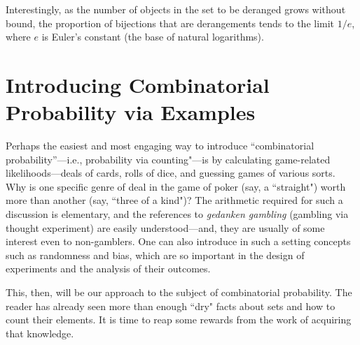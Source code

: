 \medskip

Interestingly, as the number of objects in the set to be deranged grows without bound, the
proportion of bijections that are derangements tends to the limit $1/e$, where $e$ is Euler's
constant (the base of natural logarithms).



\section{Introducing Combinatorial Probability via Examples}
\label{sec:combinatorial-prob}

 

Perhaps the easiest and most engaging way to introduce ``combinatorial probability''---i.e., probability via counting"---is by calculating game-related likelihoods---deals of cards, rolls of dice, and guessing games of various sorts.  Why is one specific genre of deal in the game of poker (say, a ``straight") worth more than another (say, ``three of a kind")?  The arithmetic required for such a discussion is elementary, and the references to {\it gedanken gambling} (gambling via thought experiment) are easily understood---and, they are usually of some interest even to non-gamblers.  One can also introduce in such a setting concepts such as randomness and bias, which are so important in the design of experiments and the analysis of their outcomes.

\smallskip

This, then, will be our approach to the subject of combinatorial probability.  The reader has already seen more than enough ``dry" facts about sets and how to count their elements.  It is time to reap some rewards from the work of acquiring that knowledge. 

